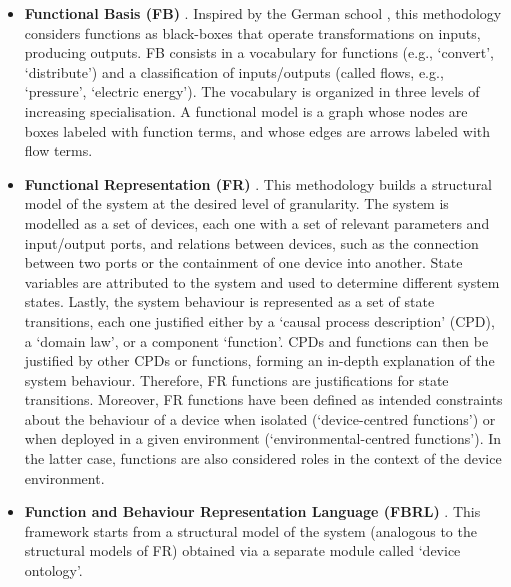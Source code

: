 \documentclass[
]{ceurart}
\begin{document}
\begin{itemize}
    \item \textbf{Functional Basis (FB)} \cite{hirtz_functional_2002}%
    . Inspired by the German school \cite{pahl_engineering_2007}, this methodology considers functions as black-boxes that operate transformations on inputs, producing outputs. FB consists in a vocabulary for functions (e.g., `convert', `distribute') and a classification of inputs/outputs (called flows, e.g., `pressure', `electric energy'). The vocabulary is organized in three levels of increasing specialisation. A functional model is a graph whose nodes are boxes labeled with function terms, and whose edges are arrows labeled with %
    flow terms. %
    \item \textbf{Functional Representation (FR)} \cite{chandrasekaranFunctionalRepresentationDesign1993, chandrasekaranFunctionDeviceRepresentation2000}. This methodology builds a structural model of the system at the desired level of granularity. The system is modelled as a set of devices, each one with a set of relevant parameters and input/output ports, and relations between devices, such as the connection between two ports or the containment of one device into another. State variables are attributed to the system and used to determine different system states. Lastly, the system behaviour is represented as a set of state transitions, each one justified either by a `causal process description' (CPD), a `domain law', or a component `function'. CPDs and functions can then be justified by other CPDs or functions, forming an in-depth explanation of the system behaviour. Therefore, FR functions are justifications for state transitions. Moreover, FR functions have been defined as intended constraints about the behaviour of a device when isolated (`device-centred functions') or when deployed in a given environment (`environmental-centred functions'). In the latter case, functions are also considered roles in the context of the device environment. %
    \item \textbf{Function and Behaviour Representation Language (FBRL)} \cite{sasajimaFBRLFunctionBehavior1995, kitamuraOntologicalModelDevice2006}. This framework starts from a structural model of the system (analogous to the structural models of FR) obtained via a separate module called `device ontology'. %

\end{itemize}
\end{document}
